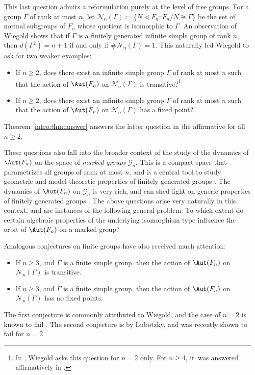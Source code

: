 This last question admits a reformulation purely at the level of free groups. For a group $\Gamma$ of rank at most $n$, let $\mathcal{N}_n(\Gamma) \coloneqq \{ N \triangleleft F_n : F_n/N \cong \Gamma \}$ be the set of normal subgroups of $F_n$ whose quotient is isomorphic to $\Gamma$. An observation of Wiegold \cite{w:tarski} shows that if $\Gamma$ is a finitely generated infinite simple group of rank $n$, then $d(\Gamma^2) = n+1$ if and only if $\# \mathcal{N}_n(\Gamma) = 1$. This naturally led Wiegold to ask for two weaker examples:
\begin{itemize}
\item \cite[Quest.\,16.100]{kourovka} If $n \geq 2$, does there exist an infinite simple group $\Gamma$ of rank at most $n$ such that the action of $\Aut(F_n)$ on $\mathcal{N}_n(\Gamma)$ is transitive?\footnote{In \cite[Quest.\,16.100]{kourovka}, Wiegold asks this question for $n = 2$ only. For $n \geq 4$, it~was answered affirmatively in \cite[Th.\,4]{garionglasner}.}
\item \cite[Quest.\,6.45]{kourovka} If $n \geq 2$, does there exist an infinite simple group $\Gamma$ of rank at most $n$ such that the action of $\Aut(F_n)$ on $\mathcal{N}_n(\Gamma)$ has a fixed point?
\end{itemize}
Theorem \ref{intro:thm:answer} answers the latter question in the affirmative for all $n \geq 2$.

These questions also fall into the broader context of the study of the dynamics of $\Aut(F_n)$ on the space of \emph{marked groups} $\mathcal{G}_n$. This is a compact space that parametrizes all groups of rank at most $n$, and is a central tool to study geometric and model-theoretic properties of finitely generated groups \cite{grigorchuk, champetier, limit, diversity, osin:law}. The dynamics of $\Aut(F_n)$ on $\mathcal{G}_n$ is very rich, and can shed light on generic properties of finitely generated groups \cite{osin:aut}. The above questions arise very naturally in this context, and are instances of the following general problem: To which extent do certain algebraic properties of the underlying isomorphism type influence the orbit of $\Aut(F_n)$ on a marked group?

\begin{remark}
\label{rem:finite}
Analogous conjectures on finite groups have also received much attention:
\begin{itemize}
\item \cite[Conj.\,2.5.4]{pak:question} If $n \geq 3$, and $\Gamma$ is a finite simple group, then the action of $\Aut(F_n)$ on $\mathcal{N}_n(\Gamma)$ is transitive.
\item \cite[p.\,25]{lubotzky:question} If $n \geq 3$, and $\Gamma$ is a finite simple group, then the action of $\Aut(F_n)$ on $\mathcal{N}_n(\Gamma)$ has no fixed points.
\end{itemize}
The first conjecture is commonly attributed to Wiegold, and the case of $n = 2$ is known to fail \cite{counterexample, counterexample:statistic}. The second conjecture is by Lubotzky, and was recently shown to fail for $n = 2$ \cite{counterexample:baby, counterexample:baby2}.
\end{remark}

